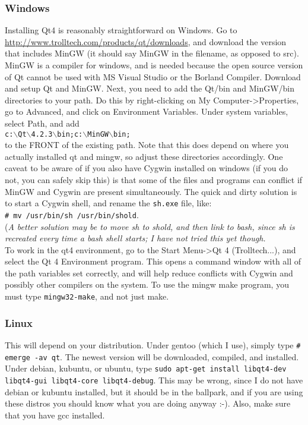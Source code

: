 \subsubsection{Windows}
Installing Qt4 is reasonably straightforward on Windows. Go to \url{http://www.trolltech.com/products/qt/downloads}, and download the version that includes MinGW (it should say MinGW in the filename, as opposed to src). MinGW is a compiler for windows, and is needed because the open source version of Qt cannot be used with MS Visual Studio or the Borland Compiler. Download and setup Qt and MinGW. Next, you need to add the Qt/bin and MinGW/bin directories to your path. Do this by right-clicking on My Computer->Properties, go to Advanced, and click on Environment Variables. Under system variables, select Path, and add\\ \texttt{c:$\backslash$Qt$\backslash$4.2.3$\backslash$bin;c:$\backslash$MinGW$\backslash$bin;}\\ 
to the FRONT of the existing path. Note that this does depend on where you actually installed qt and mingw, so adjust these directories accordingly.\newline
One caveat to be aware of if you also have Cygwin installed on windows (if you do not, you can safely skip this) is that some of the files and programs can conflict if MinGW and Cygwin are present simultaneously. The quick and dirty solution is to start a Cygwin shell, and rename the \texttt{sh.exe} file, like:\\
 \texttt{\# mv /usr/bin/sh /usr/bin/shold}. \\
(\textit{A better solution may be to move sh to shold, and then link to bash, since sh is recreated every time a bash shell starts; I have not tried this yet though.}\\
To work in the qt4 environment, go to the Start Menu->Qt 4 (Trolltech...), and select the Qt 4 Environment program. This opens a command window with all of the path variables set correctly, and will help reduce conflicts with Cygwin and possibly other compilers on the system. To use the mingw make program, you must type \texttt{mingw32-make}, and not just make.

\subsubsection{Linux}
This will depend on your distribution. Under gentoo (which I use), simply type \texttt{\# emerge -av qt}. The newest version will be downloaded, compiled, and installed. Under debian, kubuntu, or ubuntu, type \texttt{sudo apt-get install libqt4-dev libqt4-gui libqt4-core libqt4-debug}. This may be wrong, since I do not have debian or kubuntu installed, but it should be in the ballpark, and if you are using these distros you should know what you are doing anyway :-). Also, make sure that you have gcc installed.

